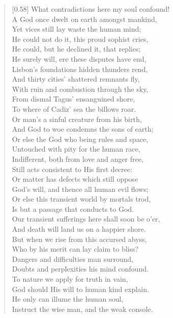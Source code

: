 \begin{verse}[0.58\textwidth]
What contradictions here my soul confound!\\
A God once dwelt on earth amongst mankind,\\
Yet vices still lay waste the human mind;\\
He could not do it, this proud sophist cries,\\
He could, but he declined it, that replies;\\
He surely will, ere these disputes have end,\\
Lisbon's foundations hidden thunders rend,\\
And thirty cities' shattered remnants fly,\\
With ruin and combustion through the sky,\\
From dismal Tagus' ensanguined shore,\\
To where of Cadiz' sea the billows roar.\\
Or man's a sinful creature from his birth,\\
And God to woe condemns the sons of earth;\\
Or else the God who being rules and space,\\
Untouched with pity for the human race,\\
Indifferent, both from love and anger free,\\
Still acts consistent to His first decree:\\
Or matter has defects which still oppose\\
God's will, and thence all human evil flows;\\
Or else this transient world by mortals trod,\\
Is but a passage that conducts to God.\\
Our transient sufferings here shall soon be o'er,\\
And death will land us on a happier shore.\\
But when we rise from this accursed abyss,\\
Who by his merit can lay claim to bliss?\\
Dangers and difficulties man surround,\\
Doubts and perplexities his mind confound.\\
To nature we apply for truth in vain,\\
God should His will to human kind explain.\\
He only can illume the human soul,\\
Instruct the wise man, and the weak console.\\

\end{verse}
